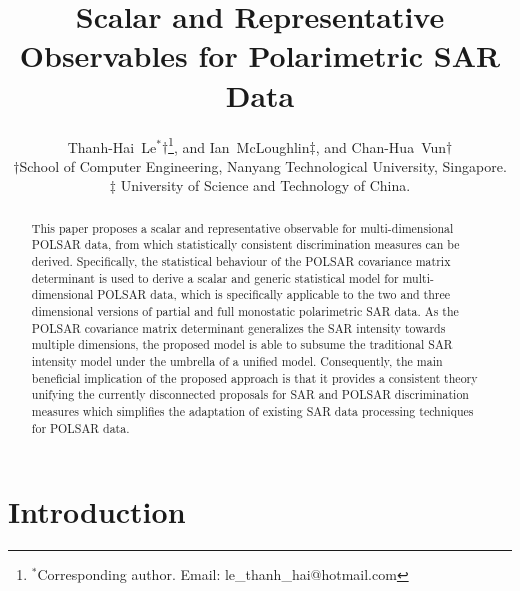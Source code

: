 \documentclass[]{tRSL2e}
\title{
  Scalar and Representative Observables for Polarimetric SAR Data
}
\begin{document}
\author{
  Thanh-Hai~Le$^{\ast}$$\dag$\thanks{$^\ast$Corresponding
author. Email: le\_thanh\_hai@hotmail.com \vspace{6pt}},
  and Ian~McLoughlin${\ddag}$, 
  and Chan-Hua~Vun${\dag}$\\
\vspace{6pt} $\dag$School of Computer Engineering, Nanyang Technological University, Singapore.\\
$\ddag$ University of Science and Technology of China.\\
\vspace{6pt} }

\maketitle

\begin{abstract}
This paper proposes a scalar and representative observable for multi-dimensional POLSAR data,
  from which statistically consistent discrimination measures can be derived.
Specifically, the statistical behaviour of the POLSAR covariance matrix determinant is used
  to derive a scalar and generic statistical model for multi-dimensional POLSAR data,
  which is specifically applicable to the two and three dimensional versions of partial and full monostatic polarimetric SAR data.
As the POLSAR covariance matrix determinant generalizes the SAR intensity towards multiple dimensions,
  the proposed model is able to subsume the traditional SAR intensity model under the umbrella of a unified model. 
Consequently, the main beneficial implication of the proposed approach is that
  it provides a consistent theory unifying the currently disconnected proposals for SAR and POLSAR discrimination measures
  which simplifies the adaptation of existing SAR data processing techniques for POLSAR data.
\end{abstract}


\section{Introduction}
\end{document}
